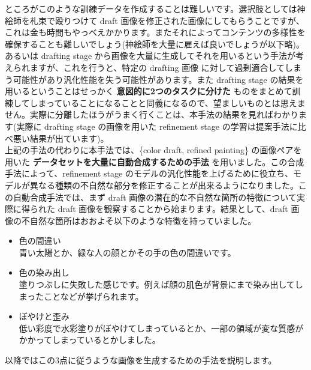 \documentclass[a4paper, dvipdfmx, 10pt]{article}
\begin{document}
ところがこのような訓練データを作成することは難しいです。選択肢としては神絵師を札束で殴りつけて draft 画像を修正された画像にしてもらうことですが、これは金も時間もやっべえかかります。またそれによってコンテンツの多様性を確保することも難しいでしょう(神絵師を大量に雇えば良いでしょうが以下略)。あるいは drafting stage から画像を大量に生成してそれを用いるという手法が考えられますが、これを行うと、特定の drafting 画像 に対して過剰適合してしまう可能性があり汎化性能を失う可能性があります。また drafting stage の結果を用いるということはせっかく \textbf{意図的に2つのタスクに分けた} ものをまとめて訓練してしまっていることになることと同義になるので、望ましいものとは思えません。実際に分離したほうがうまく行くことは、本手法の結果を見ればわかります(実際に drafting stage の画像を用いた refinement stage の学習は提案手法に比べ悪い結果が出ています)。\\

上記の手法の代わりに本手法では、\{color draft, refined painting\} の画像ペアを用いた \textbf{データセットを大量に自動合成するための手法} を用いました。この合成手法によって、refinement stage のモデルの汎化性能を上げるために役立ち、モデルが異なる種類の不自然な部分を修正することが出来るようになりました。この自動合成手法では、まず draft 画像の潜在的な不自然な箇所の特徴について実際に得られた draft 画像を観察することから始まります。結果として、draft 画像の不自然な箇所はおおよそ以下のような特徴を持っていました。\\

\begin{itemize}
\item 色の間違い\\

青い太陽とか、緑な人の顔とかその手の色の間違いです。\\

\item 色の染み出し\\

塗りつぶしに失敗した感じです。例えば顔の肌色が背景にまで染み出してしまったことなどが挙げられます。\\

\item ぼやけと歪み\\

低い彩度で水彩塗りがぼやけてしまっているとか、一部の領域が変な質感がかかってしまっているとかしました。\\
\end{itemize}

以降ではこの3点に従うような画像を生成するための手法を説明します。\\
\end{document}
